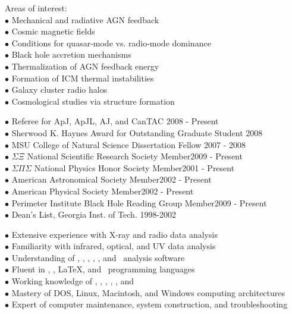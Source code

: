 \documentclass[12pt]{cv}
\begin{document}
\begin{llist}
Areas of interest:\\
$\bullet$ Mechanical and radiative AGN feedback\\
$\bullet$ Cosmic magnetic fields\\
$\bullet$ Conditions for quasar-mode vs. radio-mode dominance\\
$\bullet$ Black hole accretion mechanisms\\
$\bullet$ Thermalization of AGN feedback energy\\
$\bullet$ Formation of ICM thermal instabilities\\
$\bullet$ Galaxy cluster radio halos\\
$\bullet$ Cosmological studies via structure formation


$\bullet$ Referee for ApJ, ApJL, AJ, and CanTAC \hfill 2008 - Present\\
$\bullet$ Sherwood K. Haynes Award for Outstanding Graduate Student \hfill 2008\\
$\bullet$ MSU College of Natural Science Dissertation Fellow \hfill 2007 - 2008\\
$\bullet$ $\Sigma \Xi$ National Scientific Research Society Member\hfill 2009 - Present\\
$\bullet$ $\Sigma \Pi \Sigma$ National Physics Honor Society Member\hfill 2001 - Present\\
$\bullet$ American Astronomical Society Member\hfill 2002 - Present\\
$\bullet$ American Physical Society Member\hfill 2002 - Present\\
$\bullet$ Perimeter Institute Black Hole Reading Group Member\hfill 2009 - Present\\
$\bullet$ Dean's List, Georgia Inst. of Tech. \hfill 1998-2002


$\bullet$ Extensive experience with X-ray and radio data analysis\\
$\bullet$ Familiarity with infrared, optical, and UV data analysis\\
$\bullet$ Understanding of \aips, \casa, \ciao, \iraf, \osa, and \sas\ analysis software\\
$\bullet$ Fluent in \html, \idl, \LaTeX, and \perl\ programming languages\\
$\bullet$ Working knowledge of \clang, \fortran, \mysql, \python, \supmo, and \tcl\\
$\bullet$ Mastery of DOS, Linux, Macintosh, and Windows computing architectures\\
$\bullet$ Expert of computer maintenance, system construction, and troubleshooting


\end{llist}
\end{document}
